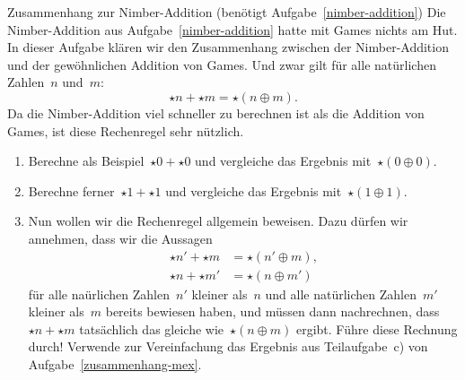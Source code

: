 \documentclass{zirkelblatt}
\begin{document}
\begin{aufgabe}{Zusammenhang zur Nimber-Addition (benötigt
Aufgabe~\ref{nimber-addition})}
\label{nimber-addition-surreal}
Die Nimber-Addition aus Aufgabe~\ref{nimber-addition} hatte mit Games nichts am
Hut. In dieser Aufgabe klären wir den Zusammenhang zwischen der Nimber-Addition
und der gewöhnlichen Addition von Games. Und zwar gilt für alle natürlichen
Zahlen~$n$ und~$m$:
\[ \star n + \star m = \star(n \oplus m). \]
Da die Nimber-Addition viel schneller zu berechnen ist als die Addition von
Games, ist diese Rechenregel sehr nützlich.
\begin{enumerate}
\item Berechne als Beispiel~$\star 0 + \star 0$ und vergleiche das Ergebnis
mit~$\star (0 \oplus 0)$.
\item Berechne ferner~$\star 1 + \star 1$ und vergleiche das Ergebnis
mit~$\star (1 \oplus 1)$.
\item Nun wollen wir die Rechenregel allgemein beweisen. Dazu dürfen wir
annehmen, dass wir die Aussagen
\begin{align*}
  \star n' + \star m &= \star(n' \oplus m), \\
  \star n + \star m' &= \star(n \oplus m')
\end{align*}
für alle naürlichen Zahlen~$n'$ kleiner als~$n$ und alle natürlichen
Zahlen~$m'$ kleiner als~$m$ bereits bewiesen haben, und müssen dann nachrechnen,
dass~$\star n + \star m$ tatsächlich das gleiche wie~$\star(n \oplus m)$
ergibt. Führe diese Rechnung durch! Verwende zur Vereinfachung das Ergebnis aus
Teilaufgabe~c) von Aufgabe~\ref{zusammenhang-mex}.
\end{enumerate}
\end{aufgabe}
\end{document}
